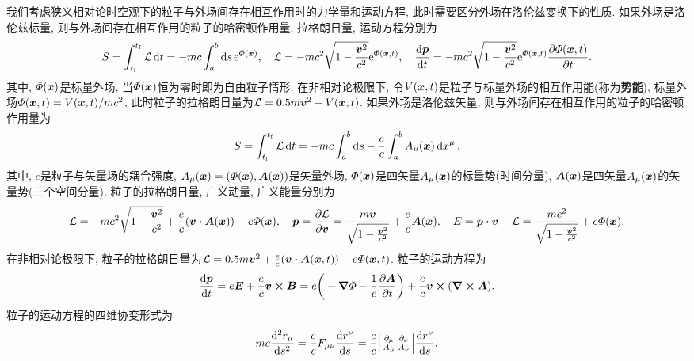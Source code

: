 我们考虑狭义相对论时空观下的粒子与外场间存在相互作用时的力学量和运动方程, 此时需要区分外场在洛伦兹变换下的性质. 如果外场是洛伦兹标量, 则与外场间存在相互作用的粒子的哈密顿作用量, 拉格朗日量, 运动方程分别为
\begin{equation*}
    S = \int_{t_{\mathrm{i}}}^{t_{\mathrm{f}}} \mathcal{L} \dd{t} = -mc \int_a^b \dd{s} \mathrm{e}^{\varPhi(\vb*{x})}, \quad \mathcal{L} = -mc^2 \sqrt{1-\frac{\vb*{v}^2}{c^2}} \mathrm{e}^{\varPhi(\vb*{x},t)}, \quad \dv{\vb*{p}}{t} = -mc^2 \sqrt{1-\frac{\vb*{v}^2}{c^2}} \mathrm{e}^{\varPhi(\vb*{x},t)} \pdv{\varPhi(\vb*{x},t)}{t}.
\end{equation*}
其中, $ \varPhi(\vb*{x}) $是标量外场, 当$ \varPhi(\vb*{x}) $恒为零时即为自由粒子情形. 在非相对论极限下, 令$ V(\vb*{x},t) $是粒子与标量外场的相互作用能(称为\textbf{势能}), 标量外场$ \varPhi(\vb*{x},t)=V(\vb*{x},t)/mc^2 $, 此时粒子的拉格朗日量为$ \mathcal{L} = 0.5 m\vb*{v}^2 - V(\vb*{x},t) $. 如果外场是洛伦兹矢量, 则与外场间存在相互作用的粒子的哈密顿作用量为
\begin{equation*}
    S = \int_{t_{\mathrm{i}}}^{t_{\mathrm{f}}} \mathcal{L} \dd{t} = -mc \int_a^b \dd{s} - \frac{e}{c} \int_a^b A_{\mu} (\vb*{x}) \dd{x^{\mu}}.
\end{equation*}
其中, $ e $是粒子与矢量场的耦合强度, $ A_{\mu} (\vb*{x})=(\varPhi(\vb*{x}),\vb*{A}(\vb*{x})) $是矢量外场, $ \varPhi(\vb*{x}) $是四矢量$ A_{\mu} (\vb*{x}) $的标量势(时间分量), $ \vb*{A}(\vb*{x}) $是四矢量$ A_{\mu} (\vb*{x}) $的矢量势(三个空间分量). 粒子的拉格朗日量, 广义动量, 广义能量分别为
\begin{equation*}
    \lagr = -mc^2 \sqrt{1-\frac{\vb*{v}^2}{c^2}} + \frac{e}{c} (\vb*{v} \vdot \vb*{A}(\vb*{x})) - e \varPhi(\vb*{x}), \quad \vb*{p} = \pdv{\lagr}{\vb*{v}} = \frac{m\vb*{v}}{\sqrt{1-\frac{\vb*{v}^2}{c^2}}} + \frac{e}{c} \vb*{A}(\vb*{x}), \quad E = \vb*{p} \vdot \vb*{v} - \lagr = \frac{mc^2}{\sqrt{1-\frac{\vb*{v}^2}{c^2}}} + e \varPhi(\vb*{x}).
\end{equation*}
在非相对论极限下, 粒子的拉格朗日量为$ \lagr = 0.5 m\vb*{v}^2 + \frac{e}{c} (\vb*{v} \vdot \vb*{A}(\vb*{x},t)) - e \varPhi(\vb*{x},t) $. 粒子的运动方程为
\begin{equation*}
    \dv{\vb*{p}}{t} = e\vb*{E} + \frac{e}{c} \vb*{v} \cross \vb*{B} = e \bigg( -\grad{\varPhi}-\frac{1}{c}\pdv{\vb*{A}}{t}\bigg) + \frac{e}{c} \vb*{v} \cross (\curl{\vb*{A}}).
\end{equation*}
粒子的运动方程的四维协变形式为
\begin{equation*}
    mc \dv[2]{r_{\mu}}{s} = \frac{e}{c} F_{\mu\nu} \dv{r^{\nu}}{s} = \frac{e}{c} \smdet{\partial_{\mu} & \partial_{\nu} \\ A_{\mu} & A_{\nu}} \dv{r^{\nu}}{s}.
\end{equation*}
